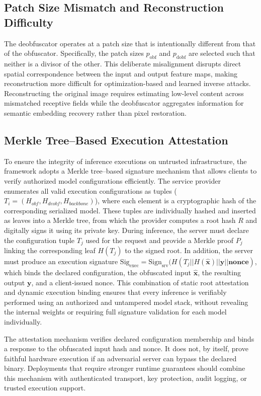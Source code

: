 \documentclass{ieeeaccess}
\newcommand{\rev}[1]{{\color{black}#1}}
\begin{document}
\subsection{\rev{Patch Size Mismatch and Reconstruction Difficulty}}
\rev{The deobfuscator operates at a patch size that is intentionally different from that of the obfuscator. Specifically, the patch sizes $p_{\text{obf}}$ and $p_{\text{dobf}}$ are selected such that neither is a divisor of the other. This deliberate misalignment disrupts direct spatial correspondence between the input and output feature maps, making reconstruction more difficult for optimization-based and learned inverse attacks. Reconstructing the original image requires estimating low-level content across mismatched receptive fields while the deobfuscator aggregates information for semantic embedding recovery rather than pixel restoration.}

\subsection{Merkle Tree--Based Execution Attestation}
To ensure the integrity of inference executions on untrusted infrastructure, the framework adopts a Merkle tree--based signature mechanism that allows clients to verify authorized model configurations efficiently. The service provider enumerates all valid execution configurations as tuples ($T_i = (H_{obf},H_{deobf},H_{backbone})$), where each element is a cryptographic hash of the corresponding serialized model. These tuples are individually hashed and inserted as leaves into a Merkle tree, from which the provider computes a root hash $R$ and digitally signs it using its private key. During inference, the server must declare the configuration tuple $T_j$ used for the request and provide a Merkle proof $P_j$ linking the corresponding leaf $H(T_j)$ to the signed root. In addition, the server must produce an execution signature $\textrm{Sig}_{\text{exec}} = \textrm{Sign}_{\text{srv}}(H(T_j||H(\hat{\textbf{x}})||\textbf{y}||\textbf{nonce})$, which binds the declared configuration, the obfuscated input $\hat{\mathbf{x}}$, the resulting output $\mathbf{y}$, and a client-issued nonce. This combination of static root attestation and dynamic execution binding ensures that every inference is verifiably performed using an authorized and untampered model stack, without revealing the internal weights or requiring full signature validation for each model individually.

\rev{The attestation mechanism verifies declared configuration membership and binds a response to the obfuscated input hash and nonce. It does not, by itself, prove faithful hardware execution if an adversarial server can bypass the declared binary. Deployments that require stronger runtime guarantees should combine this mechanism with authenticated transport, key protection, audit logging, or trusted execution support.}
\end{document}
